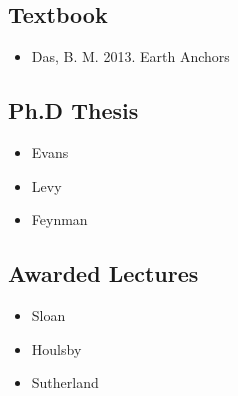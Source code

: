 \documentclass[a4paper, nobind]{templates/ociamthesis}
\providecommand{\tightlist}{%
  \setlength{\itemsep}{0pt}\setlength{\parskip}{0pt}}
\newcommand*{\bibtitle}{Works Cited}
\begin{document}
\hypertarget{textbook}{%
\subsection{Textbook}\label{textbook}}

\begin{itemize}
\tightlist
\item
  Das, B. M. 2013. Earth Anchors
\end{itemize}

\hypertarget{ph.d-thesis}{%
\subsection{Ph.D Thesis}\label{ph.d-thesis}}

\begin{itemize}
\tightlist
\item
  Evans
\item
  Levy
\item
  Feynman
\end{itemize}

\hypertarget{awarded-lectures}{%
\subsection{Awarded Lectures}\label{awarded-lectures}}

\begin{itemize}
\tightlist
\item
  Sloan
\item
  Houlsby
\item
  Sutherland
\end{itemize}


\setlength{\baselineskip}{0pt} %

{\renewcommand*\MakeUppercase[1]{#1}%
\printbibliography[heading=bibintoc,title={\bibtitle}]}
\end{document}

